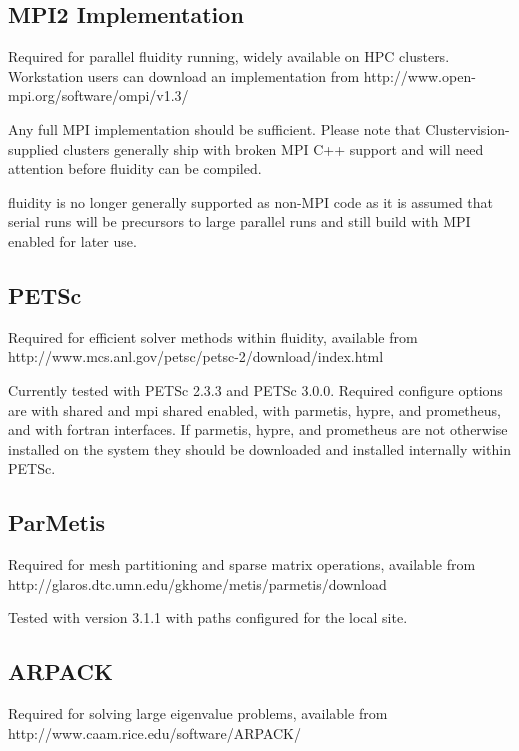\subsection{MPI2 Implementation}
\label{sect:required_libraries_mpi2}

Required for parallel fluidity running, widely available on HPC clusters.
Workstation users can download an implementation from
http://www.open-mpi.org/software/ompi/v1.3/

Any full MPI implementation should be sufficient. Please note that
Clustervision-supplied clusters generally ship with broken MPI C++ support and
will need attention before fluidity can be compiled.

fluidity is no longer generally supported as non-MPI code as it is assumed that
serial runs will be precursors to large parallel runs and still build with MPI
enabled for later use.

\subsection{PETSc}
\label{sect:required_libraries_petsc}

Required for efficient solver methods within fluidity, available from
http://www.mcs.anl.gov/petsc/petsc-2/download/index.html

Currently tested with PETSc 2.3.3 and PETSc 3.0.0. Required configure options
are with shared and mpi shared enabled, with parmetis, hypre, and prometheus,
and with fortran interfaces. If parmetis, hypre, and prometheus are not
otherwise installed on the system they should be downloaded and installed
internally within PETSc.

\subsection{ParMetis}
\label{sect:required_libraries_parmetis}

Required for mesh partitioning and sparse matrix operations, available from
http://glaros.dtc.umn.edu/gkhome/metis/parmetis/download

Tested with version 3.1.1 with paths configured for the local site.

\subsection{ARPACK}
\label{sect:required_libraries_arpack}

Required for solving large eigenvalue problems, available from
http://www.caam.rice.edu/software/ARPACK/

